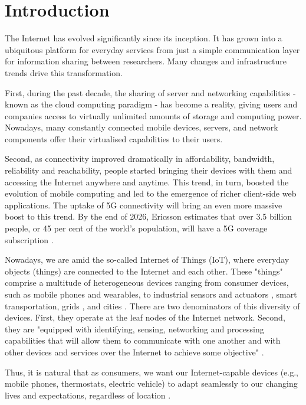\section{Introduction}
\label{sec:introduction}

The Internet has evolved significantly since its inception. It has grown into a ubiquitous platform for everyday services from just a simple communication layer for information sharing between researchers. Many changes and infrastructure trends drive this transformation.

First, during the past decade, the sharing of server and networking capabilities - known as the cloud computing paradigm - has become a reality, giving users and companies access to virtually unlimited amounts of storage and computing power. Nowadays, many constantly connected mobile devices, servers, and network components offer their virtualised capabilities to their users.

Second, as connectivity improved dramatically in affordability, bandwidth, reliability and reachability, people started bringing their devices with them and accessing the Internet anywhere and anytime. This trend, in turn, boosted the evolution of mobile computing and led to the emergence of richer client-side web applications. The uptake of 5G connectivity will bring an even more massive boost to this trend. By the end of 2026, Ericsson estimates that over 3.5 billion people, or 45 per cent of the world's population, will have a 5G coverage subscription \cite{ericsson-5g}.

Nowadays, we are amid the so-called Internet of Things (IoT), where everyday objects (things) are connected to the Internet and each other. These "things" comprise a multitude of heterogeneous devices ranging from consumer devices, such as mobile phones and wearables, to industrial sensors and actuators \cite{iot-manifacturing}, smart transportation, grids \cite{dsu}, and cities \cite{saaas}. There are two denominators of this diversity of devices. First, they operate at the leaf nodes of the Internet network. Second, they are "equipped with identifying, sensing, networking and processing capabilities that will allow them to communicate with one another and with other devices and services over the Internet to achieve some objective" \cite{iot-definition}.

Thus, it is natural that as consumers, we want our Internet-capable devices (e.g., mobile phones, thermostats, electric vehicle) to adapt seamlessly to our changing lives and expectations, regardless of location \cite{harnessing-continuum}.

